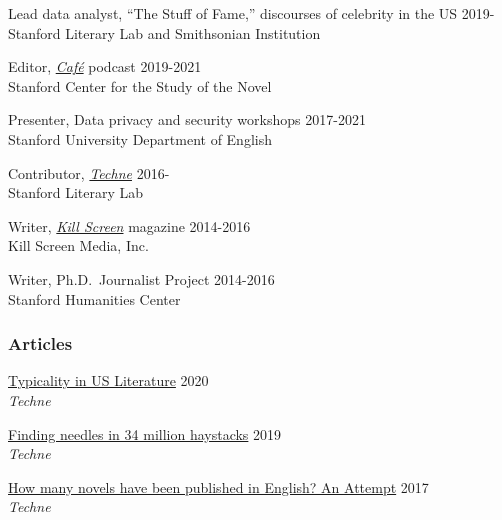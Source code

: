 \documentclass[
  12pt,
  letterpaper,
]{article}
\begin{document}
Lead data analyst, ``The Stuff of Fame,'' discourses of celebrity in the
US \hfill 2019-\\
\hspace*{0.333em} Stanford Literary Lab and Smithsonian Institution

Editor, \href{https://novel.stanford.edu/csn-cafe}{\emph{Café}} podcast
\hfill 2019-2021\\
\hspace*{0.333em} Stanford Center for the Study of the Novel

Presenter, Data privacy and security workshops \hfill 2017-2021\\
\hspace*{0.333em} Stanford University Department of English

Contributor, \href{https://litlab.stanford.edu/techne/}{\emph{Techne}}
\hfill 2016-\\
\hspace*{0.333em} Stanford Literary Lab

Writer, \href{https://web.archive.org/web/20221003115514/https://killscreen.com/previously/author/erik-fredner/}{\emph{Kill Screen}} magazine \hfill 2014-2016\\
\hspace*{0.333em} Kill Screen Media, Inc.

Writer, Ph.D.~Journalist Project \hfill 2014-2016\\
\hspace*{0.333em} Stanford Humanities Center

\hypertarget{articles}{%
\subsubsection{Articles}\label{articles}}

\href{https://web.archive.org/web/20220430165427/https://litlab.stanford.edu/typicality-in-the-u-s-novel/}{Typicality
in US Literature} \hfill 2020\\
\hspace*{0.333em} \emph{Techne}

\href{https://web.archive.org/web/20220430054802/https://litlab.stanford.edu/finding-needles-in-34-million-haystacks/}{Finding
needles in 34 million haystacks} \hfill 2019\\
\hspace*{0.333em} \emph{Techne}

\href{https://web.archive.org/web/20220323072937/https://litlab.stanford.edu/how-many-novels-have-been-published-in-english-an-attempt/}{How
many novels have been published in English? An Attempt} \hfill 2017\\
\hspace*{0.333em} \emph{Techne}
\end{document}
